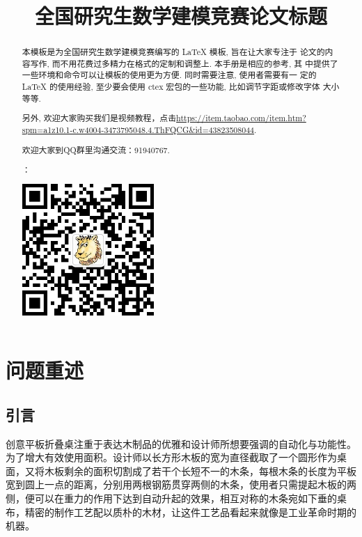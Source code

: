 \documentclass[bwprint]{gmcmthesis}
\title{全国研究生数学建模竞赛论文标题}
\begin{document}
 \maketitle
 \begin{abstract}
 本模板是为全国研究生数学建模竞赛编写的 \LaTeX{} 模板, 旨在让大家专注于
论文的内容写作, 而不用花费过多精力在格式的定制和调整上. 本手册是相应的参考, 其
中提供了一些环境和命令可以让模板的使用更为方便. 同时需要注意, 使用者需要有一
定的 \LaTeX{} 的使用经验, 至少要会使用 ctex 宏包的一些功能, 比如调节字距或修改字体
大小等等.


另外, 欢迎大家购买我们是视频教程，点击\url{https://item.taobao.com/item.htm?spm=a1z10.1-c.w4004-3473795048.4.ThFQCG&id=43823508044}.

欢迎大家到QQ群里沟通交流：91940767.

：

\centerline{\includegraphics[width=5cm]{gongzhonghao}}


\end{abstract}

\pagestyle{plain}

\tableofcontents

\section{问题重述}

\subsection{引言}

创意平板折叠桌注重于表达木制品的优雅和设计师所想要强调的自动化与功能性。为了增大有效使用面积。设计师以长方形木板的宽为直径截取了一个圆形作为桌面，又将木板剩余的面积切割成了若干个长短不一的木条，每根木条的长度为平板宽到圆上一点的距离，分别用两根钢筋贯穿两侧的木条，使用者只需提起木板的两侧，便可以在重力的作用下达到自动升起的效果，相互对称的木条宛如下垂的桌布，精密的制作工艺配以质朴的木材，让这件工艺品看起来就像是工业革命时期的机器。
\end{document}
